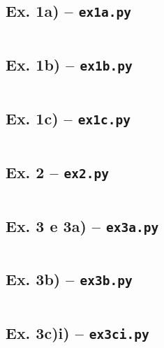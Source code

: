 \documentclass[9pt,a4paper]{tau-class/tau}
\theoremstyle{definition}
\numberwithin{definition}{subsection}
\numberwithin{theorem}{subsection}
\numberwithin{example}{subsection}
\numberwithin{observation}{subsection}
\numberwithin{lemma}{subsection}
\begin{document}
\subsection*{Ex. 1a) -- \texttt{ex1a.py}}
\inputminted[fontsize=\scriptsize, linenos, breaklines, frame=lines]{python}{ex1a.py}

\subsection*{Ex. 1b) -- \texttt{ex1b.py}}
\inputminted[fontsize=\scriptsize, linenos, breaklines, frame=lines]{python}{ex1b.py}

\subsection*{Ex. 1c) -- \texttt{ex1c.py}}
\inputminted[fontsize=\scriptsize, linenos, breaklines, frame=lines]{python}{ex1c.py}

\subsection*{Ex. 2 -- \texttt{ex2.py}}
\inputminted[fontsize=\scriptsize, linenos, breaklines, frame=lines]{python}{ex2.py}

\subsection*{Ex. 3 e 3a) -- \texttt{ex3a.py}}
\inputminted[fontsize=\scriptsize, linenos, breaklines, frame=lines]{python}{ex3a.py}

\subsection*{Ex. 3b) -- \texttt{ex3b.py}}
\inputminted[fontsize=\scriptsize, linenos, breaklines, frame=lines]{python}{ex3b.py}

\subsection*{Ex. 3c)i) -- \texttt{ex3ci.py}}
\inputminted[fontsize=\scriptsize, linenos, breaklines, frame=lines]{python}{ex3ci.py}
\end{document}
